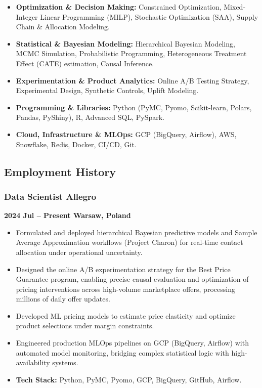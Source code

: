 \documentclass[
  9pt,
  letterpaper,
  DIV=11,
  numbers=noendperiod]{scrartcl}
\providecommand{\tightlist}{%
  \setlength{\itemsep}{0pt}\setlength{\parskip}{0pt}}\usepackage{longtable,booktabs,array}
\begin{document}
\begin{itemize}
\tightlist
\item
  \textbf{Optimization \& Decision Making:} Constrained Optimization,
  Mixed-Integer Linear Programming (MILP), Stochastic Optimization
  (SAA), Supply Chain \& Allocation Modeling.
\item
  \textbf{Statistical \& Bayesian Modeling:} Hierarchical Bayesian
  Modeling, MCMC Simulation, Probabilistic Programming, Heterogeneous
  Treatment Effect (CATE) estimation, Causal Inference.
\item
  \textbf{Experimentation \& Product Analytics:} Online A/B Testing
  Strategy, Experimental Design, Synthetic Controls, Uplift Modeling.
\item
  \textbf{Programming \& Libraries:} Python (PyMC, Pyomo, Scikit-learn,
  Polars, Pandas, PyShiny), R, Advanced SQL, PySpark.
\item
  \textbf{Cloud, Infrastructure \& MLOps:} GCP (BigQuery, Airflow), AWS,
  Snowflake, Redis, Docker, CI/CD, Git.
\end{itemize}

\hypertarget{employment-history}{%
\subsection{Employment History}\label{employment-history}}

\hypertarget{data-scientist-allegro}{%
\subsubsection{Data Scientist \textbar{}
Allegro}\label{data-scientist-allegro}}

\textbf{2024 Jul -- Present \textbar{} Warsaw, Poland}

\begin{itemize}
\tightlist
\item
  Formulated and deployed hierarchical Bayesian predictive models and
  Sample Average Approximation workflows (Project Charon) for real-time
  contact allocation under operational uncertainty.
\item
  Designed the online A/B experimentation strategy for the Best Price
  Guarantee program, enabling precise causal evaluation and optimization
  of pricing interventions across high-volume marketplace offers,
  processing millions of daily offer updates.
\item
  Developed ML pricing models to estimate price elasticity and optimize
  product selections under margin constraints.
\item
  Engineered production MLOps pipelines on GCP (BigQuery, Airflow) with
  automated model monitoring, bridging complex statistical logic with
  high-availability systems.
\item
  \textbf{Tech Stack:} Python, PyMC, Pyomo, GCP, BigQuery, GitHub,
  Airflow.
\end{itemize}
\end{document}

